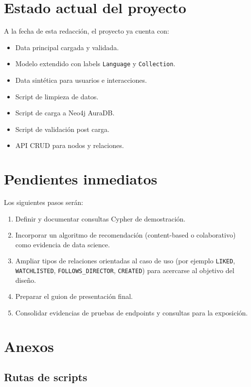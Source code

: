 \documentclass[12pt,a4paper]{article}
\begin{document}
\section{Estado actual del proyecto}

A la fecha de esta redacción, el proyecto ya cuenta con:

\begin{itemize}
    \item Data principal cargada y validada.
    \item Modelo extendido con labels \texttt{Language} y \texttt{Collection}.
    \item Data sintética para usuarios e interacciones.
    \item Script de limpieza de datos.
    \item Script de carga a Neo4j AuraDB.
    \item Script de validación post carga.
    \item API CRUD para nodos y relaciones.
\end{itemize}

\section{Pendientes inmediatos}

Los siguientes pasos serán:

\begin{enumerate}
    \item Definir y documentar consultas Cypher de demostración.
    \item Incorporar un algoritmo de recomendación (content-based o colaborativo) como evidencia de data science.
    \item Ampliar tipos de relaciones orientadas al caso de uso (por ejemplo \texttt{LIKED}, \texttt{WATCHLISTED}, \texttt{FOLLOWS\_DIRECTOR}, \texttt{CREATED}) para acercarse al objetivo del diseño.
    \item Preparar el guion de presentación final.
    \item Consolidar evidencias de pruebas de endpoints y consultas para la exposición.
\end{enumerate}

\section{Anexos}

\subsection{Rutas de scripts}
\end{document}
